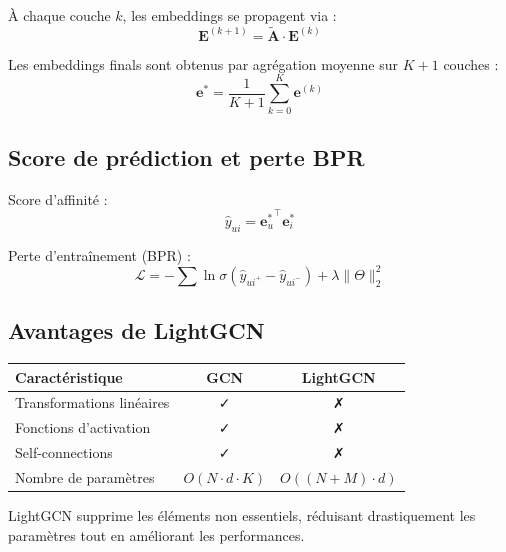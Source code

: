 \documentclass[12pt,a4paper]{report}
\begin{document}
À chaque couche $k$, les embeddings se propagent via :
\begin{equation}
  \mathbf{E}^{(k+1)} = \tilde{\mathbf{A}} \cdot \mathbf{E}^{(k)}
\end{equation}

Les embeddings finals sont obtenus par agrégation moyenne sur $K+1$ couches :
\begin{equation}
  \mathbf{e}^* = \frac{1}{K+1}\sum_{k=0}^{K}\mathbf{e}^{(k)}
\end{equation}

\subsection{Score de prédiction et perte BPR}

Score d'affinité :
\begin{equation}
  \hat{y}_{ui} = {\mathbf{e}_u^*}^\top \mathbf{e}_i^*
\end{equation}

Perte d'entraînement (BPR) :
\begin{equation}
  \mathcal{L} = -\sum \ln\sigma(\hat{y}_{ui^+} - \hat{y}_{ui^-}) + \lambda\|\Theta\|_2^2
\end{equation}

\subsection{Avantages de LightGCN}

\begin{center}
\begin{tabular}{lcc}
\toprule
\textbf{Caractéristique} & \textbf{GCN} & \textbf{LightGCN} \\
\midrule
Transformations linéaires & ✓ & ✗ \\
Fonctions d'activation & ✓ & ✗ \\
Self-connections & ✓ & ✗ \\
Nombre de paramètres & $O(N \cdot d \cdot K)$ & $O((N+M) \cdot d)$ \\
\bottomrule
\end{tabular}
\end{center}

LightGCN supprime les éléments non essentiels, réduisant drastiquement les
paramètres tout en améliorant les performances.

\end{document}
